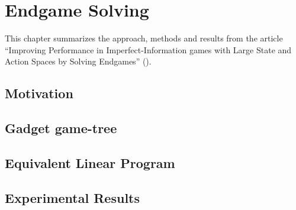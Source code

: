 \chapter{Endgame Solving}

This chapter summarizes the approach, methods and results from the article ``Improving Performance in Imperfect\hyp{}Information games with Large State and Action Spaces by Solving Endgames'' (\cite{GanzfriedSandholm13improving}).

\section{Motivation}

\section{Gadget game-tree}

\section{Equivalent Linear Program}

\section{Experimental Results}
